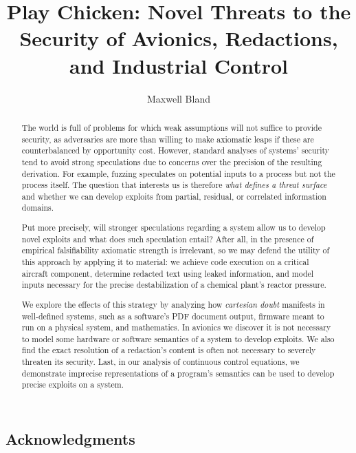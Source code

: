 \documentclass[
    11pt,
    edeposit,
    forcebottom]{uiucthesis2020}
\title{Play Chicken: Novel Threats to the Security of Avionics, Redactions, and Industrial Control}
\author{Maxwell Bland}
\begin{document}
\maketitle


\begin{frontmatter}

\begin{abstract}
The world is full of problems for which weak assumptions will not suffice to provide security, as adversaries are more than willing to make axiomatic leaps if these are counterbalanced by opportunity cost.
However, standard analyses of systems' security tend to avoid strong speculations due to concerns over the precision of the resulting derivation.
For example, fuzzing speculates on potential inputs to a process but not the process itself.
The question that interests us is therefore \emph{what defines a threat surface} and whether we can develop exploits from partial, residual, or correlated information domains.

Put more precisely, will stronger speculations regarding a system allow us to develop novel exploits and what does such speculation entail?
After all, in the presence of empirical falsifiability axiomatic strength is irrelevant, so we may defend the utility of this approach by applying it to material: we achieve code execution on a critical aircraft component, determine redacted text using leaked information, and model inputs necessary for the precise destabilization of a chemical plant's reactor pressure.

We explore the effects of this strategy by analyzing how \emph{cartesian doubt} manifests in well-defined systems, such as a software's PDF document output, firmware meant to run on a physical system, and mathematics.
In avionics we discover it is not necessary to model some hardware or software semantics of a system to develop exploits.
We also find the exact resolution of a redaction's content is often not necessary to severely threaten its security.
Last, in our analysis of continuous control equations, we demonstrate imprecise representations of a program's semantics can be used to develop precise exploits on a system.
\end{abstract}

\chapter*{Acknowledgments}


\end{frontmatter}
\end{document}
